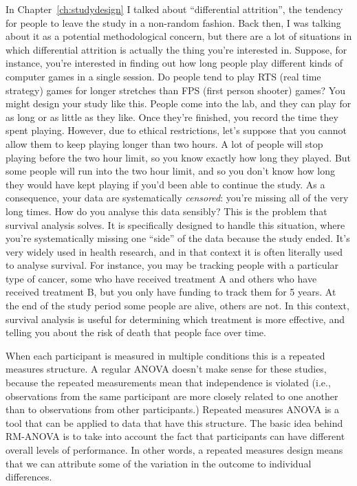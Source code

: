\begin{itemize}
 In Chapter~\ref{ch:studydesign} I talked about ``differential attrition'', the tendency for people to leave the study in a non-random fashion. Back then, I was talking about it as a potential methodological concern, but there are a lot of situations in which differential attrition is actually the thing you're interested in. Suppose, for instance, you're interested in finding out how long people play different kinds of computer games in a single session. Do people tend to play RTS (real time strategy) games for longer stretches than FPS (first person shooter) games? You might design your study like this. People come into the lab, and they can play for as long or as little as they like. Once they're finished, you record the time they spent playing. However, due to ethical restrictions, let's suppose that you cannot allow them to keep playing longer than two hours. A lot of people will stop playing before the two hour limit, so you know exactly how long they played. But some people will run into the two hour limit, and so you don't know how long they would have kept playing if you'd been able to continue the study. As a consequence, your data are systematically {\it censored}: you're missing all of the very long times. How do you analyse this data sensibly? This is the problem that survival analysis solves. It is specifically designed to handle this situation, where you're systematically missing one ``side'' of the data because the study ended. It's very widely used in health research, and in that context it is often literally used to analyse survival. For instance, you may be tracking people with a particular type of cancer, some who have received treatment A and others who have received treatment B, but you only have funding to track them for 5 years. At the end of the study period some people are alive, others are not. In this context, survival analysis is useful for determining which treatment is more effective, and telling you about the risk of death that people face over time. 

 When each participant is measured in multiple conditions this is a repeated measures structure. A regular ANOVA doesn't make sense for these studies, because the repeated measurements mean that independence is violated (i.e., observations from the same participant are more closely related to one another than to observations from other participants.) Repeated measures ANOVA is a tool that can be applied to data that have this structure. The basic idea behind RM-ANOVA is to take into account the fact that participants can have different overall levels of performance. In other words, a repeated measures design means that we can attribute some of the variation in the outcome to individual differences. 


\end{itemize}
